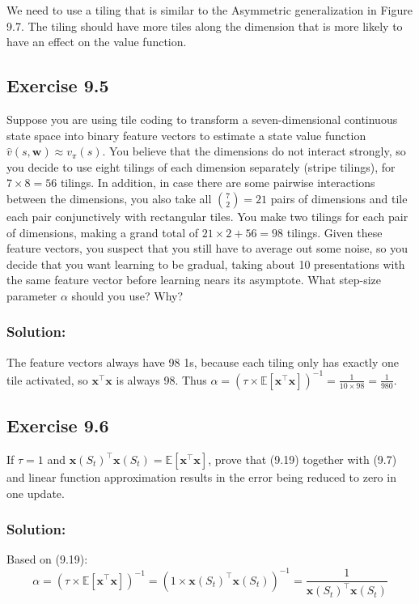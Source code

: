 We need to use a tiling that is similar to the Asymmetric generalization in Figure 9.7. The tiling should have more tiles along the dimension that is more likely to have an effect on the value function.

\subsection*{Exercise 9.5}
Suppose you are using tile coding to transform a seven-dimensional continuous
state space into binary feature vectors to estimate a state value function $\hat{v}(s, \mathbf{w}) \approx v_\pi(s)$.
You believe that the dimensions do not interact strongly, so you decide to use eight tilings
of each dimension separately (stripe tilings), for $7 \times 8 = 56$ tilings. In addition, in case
there are some pairwise interactions between the dimensions, you also take all  ${{7}\choose{2}} = 21$
pairs of dimensions and tile each pair conjunctively with rectangular tiles. You make
two tilings for each pair of dimensions, making a grand total of $21 \times 2 + 56 = 98$ tilings.
Given these feature vectors, you suspect that you still have to average out some noise,
so you decide that you want learning to be gradual, taking about 10 presentations with
the same feature vector before learning nears its asymptote. What step-size parameter $\alpha$
should you use? Why?

\subsubsection*{Solution:}
The feature vectors always have 98 1s, because each tiling only has exactly one tile activated, so $\mathbf{x}^\top \mathbf{x}$ is always 98. Thus $\alpha = \left(\tau \times \mathbb{E}[\mathbf{x}^\top \mathbf{x}]\right)^{-1} = \frac{1}{10 \times 98} = \frac{1}{980}$.

\subsection*{Exercise 9.6}
If $\tau = 1$ and $\mathbf{x}(S_t)^\top \mathbf{x}(S_t) = \mathbb{E}[\mathbf{x}^\top \mathbf{x}]$, prove that (9.19) together with (9.7)
and linear function approximation results in the error being reduced to zero in one update.

\subsubsection*{Solution:}
Based on (9.19):
\[
    \alpha = \left( \tau \times \mathbb{E}[\mathbf{x}^\top \mathbf{x}] \right)^{-1} = \left( 1 \times \mathbf{x}(S_t)^\top \mathbf{x}(S_t) \right)^{-1} = \frac{1}{\mathbf{x}(S_t)^\top \mathbf{x}(S_t)}
\]

